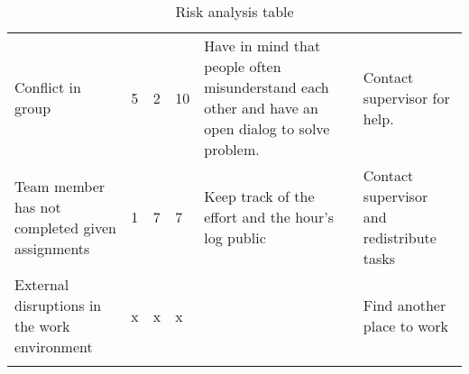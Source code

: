\begin{longtable}{|p{3.6cm}!{\vrule width -1pt}l!{\vrule width -1pt}l!{\vrule width -1pt}l!{\vrule width -1pt}p{4.4cm}!{\vrule width -1pt}p{4.4cm}|}
Conflict in group & 5 & 2 & 10 & Have in mind that people often misunderstand each other and have an open dialog to solve problem. & Contact supervisor for help.\\
Team member has not completed given assignments & 1 & 7 & 7 & Keep track of the effort and the hour's log public & Contact supervisor and redistribute tasks \\\hline
External disruptions in the work environment & x & x & x &  & Find another place to work \\\hline
\caption{Risk analysis table}
\end{longtable}
